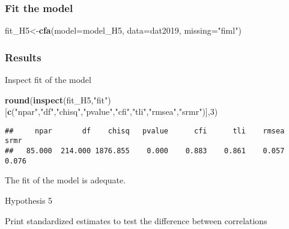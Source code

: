 \documentclass[
]{article}
\newenvironment{Shaded}{\begin{snugshade}}{\end{snugshade}}
\newcommand{\DataTypeTok}[1]{\textcolor[rgb]{0.13,0.29,0.53}{#1}}
\newcommand{\DecValTok}[1]{\textcolor[rgb]{0.00,0.00,0.81}{#1}}
\newcommand{\KeywordTok}[1]{\textcolor[rgb]{0.13,0.29,0.53}{\textbf{#1}}}
\newcommand{\NormalTok}[1]{#1}
\newcommand{\OperatorTok}[1]{\textcolor[rgb]{0.81,0.36,0.00}{\textbf{#1}}}
\newcommand{\StringTok}[1]{\textcolor[rgb]{0.31,0.60,0.02}{#1}}
\begin{document}
\hypertarget{fit-the-model}{%
\subsubsection{Fit the model}\label{fit-the-model}}

\begin{Shaded}
\begin{Highlighting}[]
\NormalTok{fit_H5<-}\KeywordTok{cfa}\NormalTok{(}\DataTypeTok{model=}\NormalTok{model_H5,}
            \DataTypeTok{data=}\NormalTok{dat2019,}
            \DataTypeTok{missing=}\StringTok{"fiml"}\NormalTok{)}
\end{Highlighting}
\end{Shaded}

\hypertarget{results-1}{%
\subsubsection{Results}\label{results-1}}

Inspect fit of the model

\begin{Shaded}
\begin{Highlighting}[]
\KeywordTok{round}\NormalTok{(}\KeywordTok{inspect}\NormalTok{(fit_H5,}\StringTok{"fit"}\NormalTok{)}
\NormalTok{      [}\KeywordTok{c}\NormalTok{(}\StringTok{"npar"}\NormalTok{,}\StringTok{"df"}\NormalTok{,}\StringTok{"chisq"}\NormalTok{,}\StringTok{"pvalue"}\NormalTok{,}\StringTok{"cfi"}\NormalTok{,}\StringTok{"tli"}\NormalTok{,}\StringTok{"rmsea"}\NormalTok{,}\StringTok{"srmr"}\NormalTok{)],}\DecValTok{3}\NormalTok{)}
\end{Highlighting}
\end{Shaded}

\begin{verbatim}
##     npar       df    chisq   pvalue      cfi      tli    rmsea     srmr 
##   85.000  214.000 1876.855    0.000    0.883    0.861    0.057    0.076
\end{verbatim}

The fit of the model is adequate.

Hypothesis 5

Print standardized estimates to test the difference between correlations

\begin{Shaded}
\end{Shaded}
\end{document}
